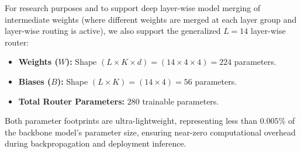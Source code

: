 For research purposes and to support deep layer-wise model merging of intermediate weights (where different weights are merged at each layer group and layer-wise routing is active), we also support the generalized $L=14$ layer-wise router:
\begin{itemize}
  \item \textbf{Weights ($W$):} Shape $(L \times K \times d) = (14 \times 4 \times 4) = 224$ parameters.
  \item \textbf{Biases ($B$):} Shape $(L \times K) = (14 \times 4) = 56$ parameters.
  \item \textbf{Total Router Parameters:} 280 trainable parameters.
\end{itemize}

Both parameter footprints are ultra-lightweight, representing less than $0.005\%$ of the backbone model's parameter size, ensuring near-zero computational overhead during backpropagation and deployment inference.